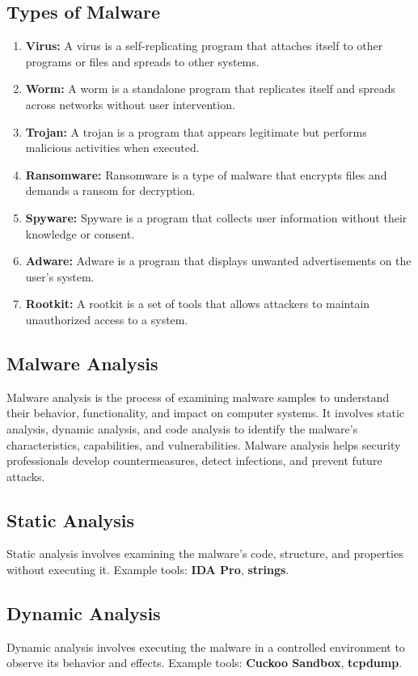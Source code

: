 \documentclass[11pt]{article}
\begin{document}
\subsection{Types of Malware}
\begin{enumerate}
    \item \textbf{Virus:} A virus is a self-replicating program that attaches itself to other programs or files and spreads to other systems.
    \item \textbf{Worm:} A worm is a standalone program that replicates itself and spreads across networks without user intervention.
    \item \textbf{Trojan:} A trojan is a program that appears legitimate but performs malicious activities when executed.
    \item \textbf{Ransomware:} Ransomware is a type of malware that encrypts files and demands a ransom for decryption.
    \item \textbf{Spyware:} Spyware is a program that collects user information without their knowledge or consent.
    \item \textbf{Adware:} Adware is a program that displays unwanted advertisements on the user's system.
    \item \textbf{Rootkit:} A rootkit is a set of tools that allows attackers to maintain unauthorized access to a system.
\end{enumerate}
\subsection{Malware Analysis}
Malware analysis is the process of examining malware samples to understand their behavior, functionality, and impact on computer systems. It involves static analysis, dynamic analysis, and code analysis to identify the malware's characteristics, capabilities, and vulnerabilities. Malware analysis helps security professionals develop countermeasures, detect infections, and prevent future attacks.
\subsection{Static Analysis}
Static analysis involves examining the malware's code, structure, and properties without executing it. Example tools: \textbf{IDA Pro}, \textbf{strings}.

\subsection{Dynamic Analysis}
Dynamic analysis involves executing the malware in a controlled environment to observe its behavior and effects. Example tools: \textbf{Cuckoo Sandbox}, \textbf{tcpdump}.
\end{document}
